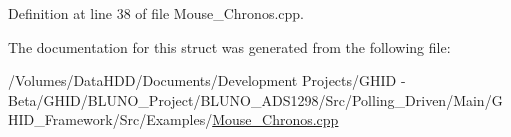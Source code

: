 \-Definition at line 38 of file \-Mouse\-\_\-\-Chronos.\-cpp.



\-The documentation for this struct was generated from the following file\-:\begin{DoxyCompactItemize}
\item 
/\-Volumes/\-Data\-H\-D\-D/\-Documents/\-Development Projects/\-G\-H\-I\-D -\/ Beta/\-G\-H\-I\-D/\-B\-L\-U\-N\-O\-\_\-\-Project/\-B\-L\-U\-N\-O\-\_\-\-A\-D\-S1298/\-Src/\-Polling\-\_\-\-Driven/\-Main/\-G\-H\-I\-D\-\_\-\-Framework/\-Src/\-Examples/\hyperlink{_mouse___chronos_8cpp}{\-Mouse\-\_\-\-Chronos.\-cpp}\end{DoxyCompactItemize}
